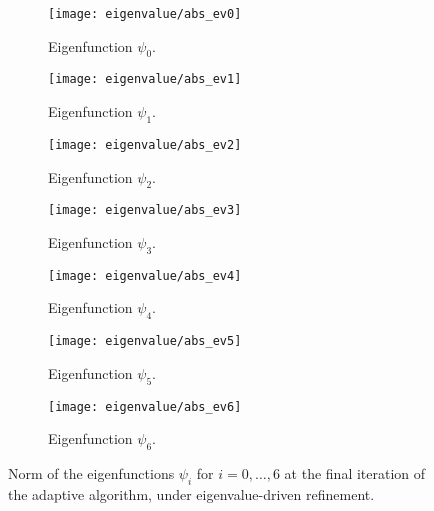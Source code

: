 \begin{figure}[htbp]
    \begin{subfigure}[t]{0.49\textwidth}
        \centering
        \texttt{[image: eigenvalue/abs\_ev0]}
        \caption{Eigenfunction \(\psi_0\).}
        \label{fig:eigenfunction_0}
    \end{subfigure}
    \begin{subfigure}[t]{0.49\textwidth}
        \centering
        \texttt{[image: eigenvalue/abs\_ev1]}
        \caption{Eigenfunction \(\psi_1\).}
        \label{fig:eigenfunction_1}
    \end{subfigure}
    \vspace{1cm}
    \begin{subfigure}[t]{0.49\textwidth}
        \centering
        \texttt{[image: eigenvalue/abs\_ev2]}
        \caption{Eigenfunction \(\psi_2\).}
        \label{fig:eigenfunction_2}
    \end{subfigure}
    \begin{subfigure}[t]{0.49\textwidth}
        \centering
        \texttt{[image: eigenvalue/abs\_ev3]}
        \caption{Eigenfunction \(\psi_3\).}
        \label{fig:eigenfunction_3}
    \end{subfigure}
    \vspace{1cm}
    \begin{subfigure}[t]{0.49\textwidth}
        \centering
        \texttt{[image: eigenvalue/abs\_ev4]}
        \caption{Eigenfunction \(\psi_4\).}
        \label{fig:eigenfunction_4}
    \end{subfigure}
    \begin{subfigure}[t]{0.49\textwidth}
        \centering
        \texttt{[image: eigenvalue/abs\_ev5]}
        \caption{Eigenfunction \(\psi_5\).}
        \label{fig:eigenfunction_5}
    \end{subfigure}
    \vspace{1cm}
    \begin{subfigure}[t]{0.49\textwidth}
        \centering
        \texttt{[image: eigenvalue/abs\_ev6]}
        \caption{Eigenfunction \(\psi_6\).}
        \label{fig:eigenfunction_6}
    \end{subfigure}
    \caption{Norm of the eigenfunctions \(\psi_i\) for \(i = 0, \ldots, 6\) at the final iteration of the adaptive algorithm, under eigenvalue-driven refinement.}
\end{figure}

